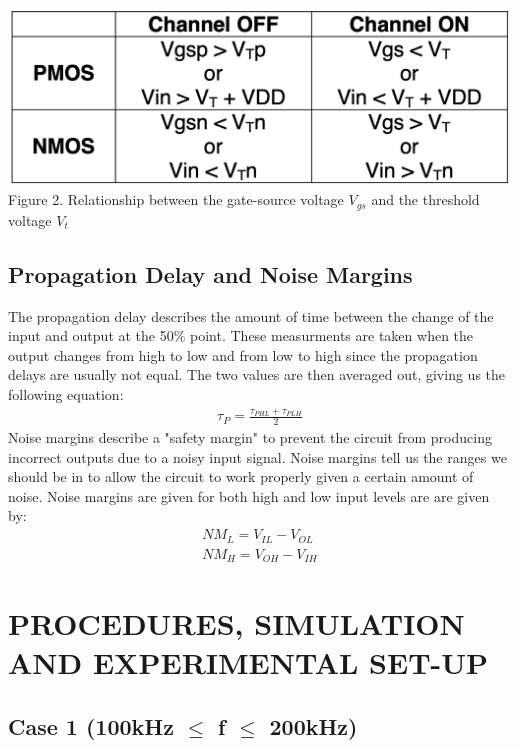 \documentclass[conference]{IEEEtran}
\begin{document}
    \begin{center}
        \includegraphics[scale = 0.32]{figures/tabel1.png}
        Figure 2. Relationship between the gate-source voltage $V_{gs}$ and the 
        threshold voltage $V_t$
    \end{center}

    \subsection{Propagation Delay and Noise Margins}
    The propagation delay describes the amount of time between the change of the input 
    and output at the 50\% point. These measurments are taken when the output changes 
    from high to low and from low to high since the propagation delays are usually not 
    equal. The two values are then averaged out, giving us the following equation:
    \begin{align}
        \tau_P = \frac{\tau_{PHL} + \tau_{PLH}}{2} 
    \end{align}
    Noise margins describe a "safety margin" to prevent the circuit from producing 
    incorrect outputs due to a noisy input signal. Noise margins tell us the ranges 
    we should be in to allow the circuit to work properly given a certain amount of 
    noise. Noise margins are given for both high and low input levels are are given 
    by:
    \begin{align}
        NM_L = V_{IL} - V_{OL}\\
        NM_H = V_{OH} - V_{IH}
    \end{align}

\section{ PROCEDURES, SIMULATION AND EXPERIMENTAL SET-UP}

\subsection{Case 1 (100kHz $\leq$ f $\leq$ 200kHz)}
\end{document}
